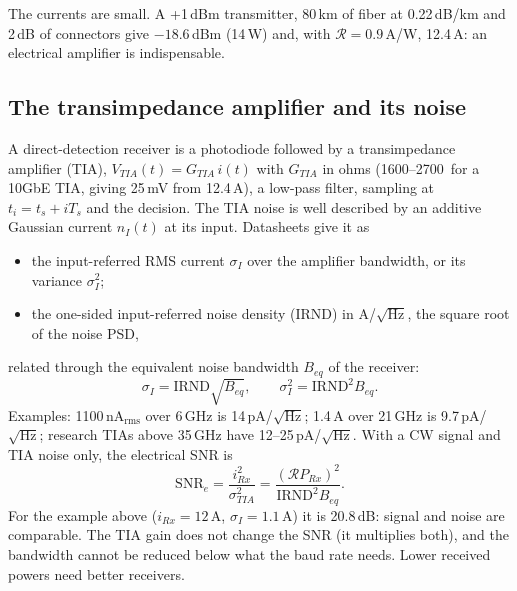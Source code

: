 The currents are small. A +1\,dBm transmitter, 80\,km of fiber at 0.22\,dB/km and 2\,dB of
connectors give $-18.6$\,dBm (14\,\textmu W) and, with $\mathcal R=0.9$\,A/W, 12.4\,\textmu A: an electrical amplifier
is indispensable.

\subsection{The transimpedance amplifier and its noise}
A direct-detection receiver is a photodiode followed by a transimpedance amplifier (TIA),
$V_{TIA}(t)=G_{TIA}\,i(t)$ with $G_{TIA}$ in ohms (1600--2700\,\textohm{} for a 10GbE TIA, giving 25\,mV
from 12.4\,\textmu A), a low-pass filter, sampling at $t_i=t_s+iT_s$ and the decision. The TIA noise is well
described by an additive Gaussian current $n_I(t)$ at its input. Datasheets give it as
\begin{itemize}
  \item the input-referred RMS current $\sigma_I$ over the amplifier bandwidth, or its variance $\sigma_I^2$;
  \item the one-sided input-referred noise density (IRND) in A/$\sqrt{\mathrm{Hz}}$, the square root of
  the noise PSD,
\end{itemize}
related through the equivalent noise bandwidth $B_{eq}$ of the receiver:
\begin{equation}
  \sigma_I=\mathrm{IRND}\sqrt{B_{eq}},\qquad \sigma_I^2=\mathrm{IRND}^2B_{eq}.
\end{equation}
Examples: 1100\,nA$_{\mathrm{rms}}$ over 6\,GHz is 14\,pA/$\sqrt{\mathrm{Hz}}$; 1.4\,\textmu A over 21\,GHz is
9.7\,pA/$\sqrt{\mathrm{Hz}}$; research TIAs above 35\,GHz have 12--25\,pA/$\sqrt{\mathrm{Hz}}$. With a CW signal and TIA noise
only, the electrical SNR is
\begin{equation}
  \mathrm{SNR}_e=\frac{i_{Rx}^2}{\sigma_{TIA}^2}=\frac{(\mathcal RP_{Rx})^2}{\mathrm{IRND}^2B_{eq}} .
\end{equation}
For the example above ($i_{Rx}=12$\,\textmu A, $\sigma_I=1.1$\,\textmu A) it is 20.8\,dB: signal and noise are
comparable. The TIA gain does not change the SNR (it multiplies both), and the bandwidth cannot be
reduced below what the baud rate needs. Lower received powers need better receivers.


